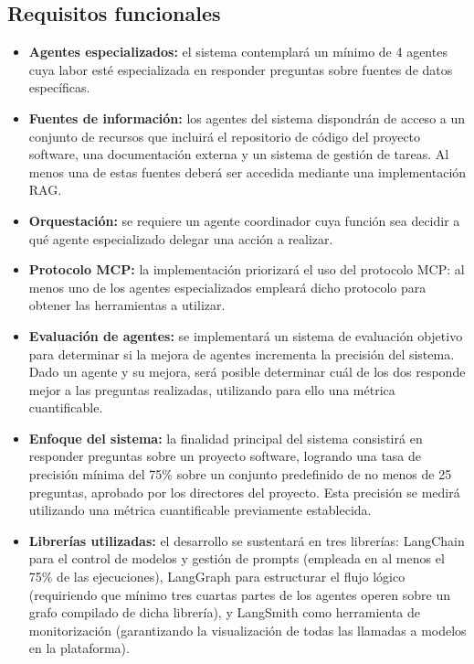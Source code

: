 \subsection{Requisitos funcionales}
\begin{itemize}
\item\textbf{Agentes especializados: }el sistema contemplará un mínimo de 4 agentes cuya labor esté especializada en responder preguntas sobre fuentes de datos específicas.
\item\textbf{Fuentes de información: }los agentes del sistema dispondrán de acceso a un conjunto de recursos que incluirá el repositorio de código del proyecto software, una documentación externa y un sistema de gestión de tareas. Al menos una de estas fuentes deberá ser accedida mediante una implementación RAG.
\item\textbf{Orquestación: }se requiere un agente coordinador cuya función sea decidir a qué agente especializado delegar una acción a realizar.
\item\textbf{Protocolo MCP: }la implementación priorizará el uso del protocolo MCP: al menos uno de los agentes especializados empleará dicho protocolo para obtener las herramientas a utilizar.
\item\textbf{Evaluación de agentes: }se implementará un sistema de evaluación objetivo para determinar si la mejora de agentes incrementa la precisión del sistema. Dado un agente y su mejora, será posible determinar cuál de los dos responde mejor a las preguntas realizadas, utilizando para ello una métrica cuantificable. 
\item\textbf{Enfoque del sistema: }la finalidad principal del sistema consistirá en responder preguntas sobre un proyecto software, logrando una tasa de precisión mínima del 75\% sobre un conjunto predefinido de no menos de 25 preguntas, aprobado por los directores del proyecto. Esta precisión se medirá utilizando una métrica cuantificable previamente establecida.
\item\textbf{Librerías utilizadas: }el desarrollo se sustentará en tres librerías: LangChain para el control de modelos y gestión de prompts (empleada en al menos el 75\% de las ejecuciones), LangGraph para estructurar el flujo lógico (requiriendo que mínimo tres cuartas partes de los agentes operen sobre un grafo compilado de dicha librería), y LangSmith como herramienta de monitorización (garantizando la visualización de todas las llamadas a modelos en la plataforma).
\end{itemize}

